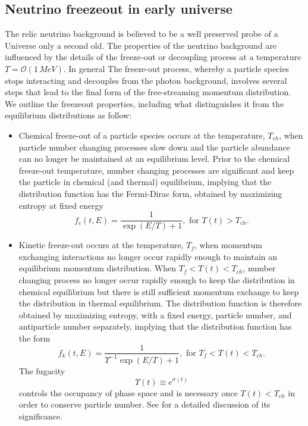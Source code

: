 \documentclass[Universe,article,submit,moreauthors,pdftex]{Definitions/mdpi}
\begin{document}
\subsection{Neutrino freezeout in early universe}\label{sec:Freezeout}
\noindent The relic neutrino background is believed to be a  well preserved probe of a Universe only a second old. The properties of the neutrino background are influenced by the details of the freeze-out or decoupling process at a temperature $T=\mathcal{O}(1\,MeV)$. In general The freeze-out process, whereby a particle species stops interacting and decouples from the photon background, involves several steps that lead to the final form of the free-streaming momentum distribution. We outline the freezeout properties, including what distinguishes it from the equilibrium distributions as follow\cite{Birrell:2012gg}:
\begin{itemize}
  \item
Chemical freeze-out of a particle species occurs at the temperature, 
$T_{ch}$, when particle number changing processes slow down and the particle abundance can no longer be maintained at an equilibrium level. Prior to the  chemical freeze-out temperature,  number changing processes are significant and keep the particle in chemical (and thermal) equilibrium, implying that the distribution function has the Fermi-Dirac form, obtained by maximizing entropy at fixed energy
\begin{equation}\label{equilibrium}
f_{c}(t,E)=\frac{1}{\exp(E/T)+1}, \text{ for } T(t)> T_{ch}.
\end{equation}

\item
Kinetic freeze-out occurs at the temperature, $T_f$, when momentum exchanging interactions no longer occur rapidly enough to maintain an equilibrium momentum distribution. When $T_f<T(t)<T_{ch}$, number changing process  no longer occur rapidly enough to keep the distribution in chemical equilibrium but there is still sufficient momentum exchange to keep the distribution in thermal equilibrium.  The distribution function is therefore obtained by maximizing entropy, with a fixed energy, particle number, and antiparticle number separately,  implying that the distribution function has the form
\begin{equation}\label{kinetic_equilib}
f_k(t,E)=\frac{1}{\Upsilon^{-1}\exp(E/T)+1}, \text{ for }T_f< T(t)< T_{ch}.
\end{equation}
The fugacity
\begin{equation}
\Upsilon(t)\equiv e^{\sigma(t)}
\end{equation}
 controls the occupancy of phase space and is necessary once $T(t)<T_{ch}$ in order to conserve particle number. See \cite{Birrell:2012gg} for a detailed discussion of its significance.
 

\end{itemize}
\end{document}
